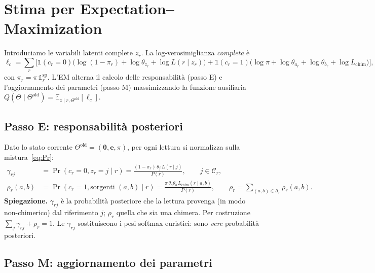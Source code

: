 \documentclass[11pt,a4paper]{article}
\newcommand{\bt}{\boldsymbol{\theta}}
\newcommand{\bpi}{\pi}
\newcommand{\ee}{\mathbf{e}}
\newcommand{\Cand}{\mathcal{C}}
\newcommand{\Split}{\mathcal{S}}
\newcommand{\E}{\mathbb{E}}
\newcommand{\I}{\mathbb{1}}
\begin{document}
\section{Stima per Expectation--Maximization}\label{sec:em}
Introduciamo le variabili latenti complete $z_r$. La log-verosimiglianza \emph{completa} \`e
\begin{equation}
\ell_c=\sum_r\Big[\I(c_r{=}0)\big(\log(1-\bpi_r)+\log\theta_{z_r}+\log L(r\mid z_r)\big)+\I(c_r{=}1)\big(\log\bpi+\log\theta_{a_r}+\log\theta_{b_r}+\log L_{\mathrm{chim}}\big)\Big],
\end{equation}
con $\bpi_r=\bpi\,\I^{\mathrm{sp}}_r$. L'EM alterna il calcolo delle responsabilit\`a (passo E) e l'aggiornamento dei parametri (passo M) massimizzando la funzione ausiliaria $Q(\Theta\mid\Theta^{\text{old}})=\E_{z\mid r,\Theta^{\text{old}}}[\ell_c]$.

\subsection{Passo E: responsabilit\`a posteriori}
Dato lo stato corrente $\Theta^{\text{old}}=(\bt,\ee,\bpi)$, per ogni lettura si normalizza sulla mistura~\eqref{eq:Pr}:
\begin{align}
\gamma_{rj}&=\Pr(c_r{=}0,z_r{=}j\mid r)=\frac{(1-\bpi_r)\,\theta_j\,L(r\mid j)}{P(r)},\qquad j\in\Cand_r,\label{eq:estep-g}\\
\rho_{r}(a,b)&=\Pr(c_r{=}1,\text{sorgenti }(a,b)\mid r)=\frac{\bpi\,\theta_a\theta_b\,L_{\mathrm{chim}}(r\mid a,b)}{P(r)},\qquad \rho_r=\!\!\sum_{(a,b)\in\Split_r}\!\!\rho_r(a,b).\label{eq:estep-r}
\end{align}
\textbf{Spiegazione.} $\gamma_{rj}$ \`e la probabilit\`a posteriore che la lettura provenga (in modo non-chimerico) dal riferimento $j$; $\rho_r$ quella che sia una chimera. Per costruzione $\sum_{j}\gamma_{rj}+\rho_r=1$. Le $\gamma_{rj}$ sostituiscono i pesi softmax euristici: sono \emph{vere} probabilit\`a posteriori.

\subsection{Passo M: aggiornamento dei parametri}
\end{document}
